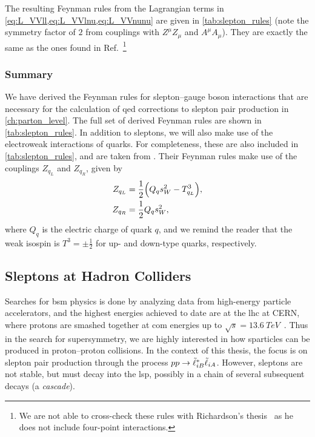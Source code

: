 The resulting Feynman rules from the Lagrangian terms in \cref{eq:L_VVll,eq:L_VVlnu,eq:L_VVnunu} are given in \cref{tab:slepton_rules} (note the symmetry factor of $2$ from couplings with $Z^\mu Z_\mu$ and $A^\mu A_\mu$).
They are exactly the same as the ones found in Ref.~\cite{Rosiek:1989sce}\footnote{
    We are not able to cross-check these rules with Richardson's thesis~\cite{Richardson:2000nt} as he does not include four-point interactions.
}

\subsubsection{Summary}
We have derived the Feynman rules for slepton--gauge boson interactions that are necessary for the calculation of \gls{qed} corrections to slepton pair production in \cref{ch:parton_level}. The full set of derived Feynman rules are shown in \cref{tab:slepton_rules}.
In addition to sleptons, we will also make use of the electroweak interactions of quarks.
For completeness, these are also included in \cref{tab:slepton_rules}, and are taken from \cite{Richardson:2000nt}.
Their Feynman rules make use of the couplings $Z_{q_L}$ and $Z_{q_R}$, given by
\begin{align}
    Z_{q_L} &= \frac{1}{2}\Bigl( Q_q s_W^2 - T^3_{q_L} \Bigr),\\
    Z_{q_R} &= \frac{1}{2}Q_q s_W^2,
\end{align}
where $Q_q$ is the electric charge of quark $q$, and we remind the reader that the weak isospin is $T^3 = \pm\frac{1}{2}$ for up- and down-type quarks, respectively.





\subsection{Sleptons at Hadron Colliders}\label{sec:hadron_colliders}

Searches for \gls{bsm} physics is done by analyzing data from high-energy particle accelerators, and the highest energies achieved to date are at the \gls{lhc} at CERN, where protons are smashed together at \gls{com} energies up to $\sqrt{s}=\qty{13.6}{TeV}$~\cite{ParticleDataGroup:2026aaa}.
Thus in the search for supersymmetry, we are highly interested in how sparticles can be produced in proton--proton collisions.
In the context of this thesis, the focus is on slepton pair production through the process $pp \to {\tilde{\ell}}_{iB}^*{\tilde{\ell}}_{iA}$.
However, sleptons are not stable, but must decay into the \gls{lsp}, possibly in a chain of several subsequent decays (a \emph{cascade}).

